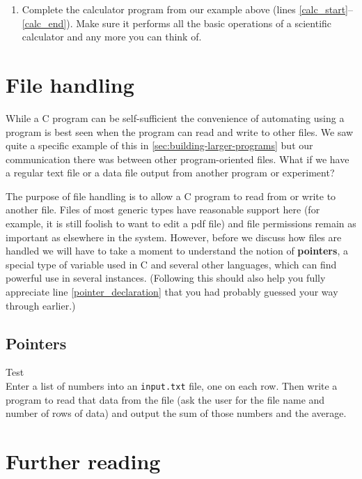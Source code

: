 \documentclass[11pt,oneside]{article}
\begin{document}
{{{{{{{{{{{{\begin{enumerate}
\item Complete the calculator program from our example above (lines \ref{calc_start}--\ref{calc_end}). Make sure it performs all the basic operations of a scientific calculator and any more you can think of.
\end{enumerate}

\section{File handling}\label{sec:file-handling}

While a C program can be self-sufficient the convenience of automating using a program is best seen when the program can read and write to other files. We saw quite a specific example of this in \ref{sec:building-larger-programs} but our communication there was between other program-oriented files. What if we have a regular text file or a data file output from another program or experiment?

The purpose of file handling is to allow a C program to read from or write to another file. Files of most generic types have reasonable support here (for example, it is still foolish to want to edit a pdf file) and file permissions remain as important as elsewhere in the system. However, before we discuss how files are handled we will have to take a moment to understand the notion of \textbf{pointers}, a special type of variable used in C and several other languages, which can find powerful use in several instances. (Following this should also help you fully appreciate line \ref{pointer_declaration} that you had probably guessed your way through earlier.)

\subsection{Pointers}

Test\\

 Enter a list of numbers into an \verb+input.txt+ file, one on each row. Then write a program to read that data from the file (ask the user for the file name and number of rows of data) and output the sum of those numbers and the average.



\section{Further reading}\label{sec:further-reading}

}}}}}}}}}}}}
\end{document}
